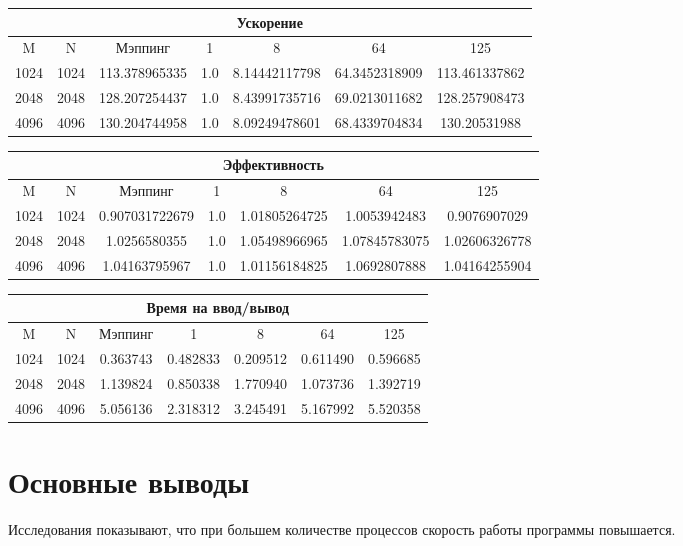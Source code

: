 \documentclass[12pt]{article}
\begin{document}
        \begin{center}
            \begin{tabular}{|c|c|c|c|c|c|c|}
                \hline
                \multicolumn{7}{|c|}{Ускорение} \\
                \hline
                M & N & Мэппинг & 1 & 8 & 64 & 125 \\
                \hline
                1024 & 1024 & 113.378965335 & 1.0 & 8.14442117798 & 64.3452318909 & 113.461337862 \\
                \hline
                2048 & 2048 & 128.207254437 & 1.0 & 8.43991735716 & 69.0213011682 & 128.257908473 \\
                \hline
                4096 & 4096 & 130.204744958 & 1.0 & 8.09249478601 & 68.4339704834 & 130.20531988 \\
                \hline
            \end{tabular}
        \end{center}

        \begin{center}
            \begin{tabular}{|c|c|c|c|c|c|c|}
                \hline
                \multicolumn{7}{|c|}{Эффективность} \\
                \hline
                M & N & Мэппинг & 1 & 8 & 64 & 125 \\
                \hline
                1024 & 1024 & 0.907031722679 & 1.0 & 1.01805264725 & 1.0053942483 & 0.9076907029 \\
                \hline
                2048 & 2048 & 1.0256580355 & 1.0 & 1.05498966965 & 1.07845783075 & 1.02606326778 \\
                \hline
                4096 & 4096 & 1.04163795967 & 1.0 & 1.01156184825 & 1.0692807888 & 1.04164255904 \\
                \hline
            \end{tabular}
        \end{center}

        \begin{center}
            \begin{tabular}{|c|c|c|c|c|c|c|}
                \hline
                \multicolumn{7}{|c|}{Время на ввод/вывод} \\
                \hline
                M & N & Мэппинг & 1 & 8 & 64 & 125 \\
                \hline
                1024 & 1024 & 0.363743 & 0.482833 & 0.209512 & 0.611490 & 0.596685 \\
                \hline
                2048 & 2048 & 1.139824 & 0.850338 & 1.770940 & 1.073736 & 1.392719 \\
                \hline
                4096 & 4096 & 5.056136 & 2.318312 & 3.245491 & 5.167992 & 5.520358 \\
                \hline
            \end{tabular}
        \end{center}

    \section{Основные выводы}
        Исследования показывают, что при большем количестве процессов скорость работы
        программы повышается.
    
    
\end{document}
